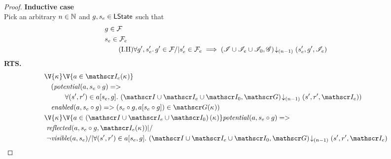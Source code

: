 \begin{lemma}
\begin{proof}
\noindent\textbf{Inductive case }\\
Pick an arbitrary $n \in \mathbb{N}$ and $g, s_e \in \textsf{LState}$ such that
%
\begin{align}
	& g \in  \mathcal{F}_{} \label{LEC:Ass1}\\
	& s_e \in \mathcal{F}_{e} \label{LEC:Ass2}\\
	& \tag{I.H} \forall g', s_e'.\,  g' \in \mathcal{F}_{} /| s'_e \in \mathcal{F}_{e} \implies \left(\mathscr{I} \cup \mathscr{I}_{e} \cup \mathscr{I}_0, \mathscr{G}\right) \!\downarrow_{(n-1)} \left(s_e', g', \mathscr{I}_{e}\right) \label{LEC:IH}
\end{align}
%
\textbf{RTS.}
%
\begin{align}
	& 
	\V{\ca{}}  \V{a\in \lmod_e(\ca{})} \nonumber \\
  &\quad (\m{potential}(a, s_e \composeL g)  => \nonumber\\
  & \quad\qquad\for{(s', r') \in a[s_e, g]} \extendsAMUpto{\lmod \cup \lmod_e \cup \lmod_0, \gmod}{(n-1)}{s'}{r'}{\lmod_e}) \label{LEC:Goal1}\\
%  
  &\quad \m{enabled}(a,s_e \composeL g)
  => (s_e \composeL g, a[s_e \composeL g])\in \gmod(\ca{})) \label{LEC:Goal2}\\
%  
  &\V{\ca{}}\V{a\in \left(\lmod \cup \lmod_e \cup \lmod_0 \right) (\ca{})}
  \m{potential}(a,s_e \composeL g) =>\null \nonumber \\
  &\ \m{reflected}(a, s_e \composeL g,\lmod_e(\ca{})) |/\null \nonumber \\
%  
  &\ \neg\m{visible}(a, s_e) /| \for{(s', r') \in a[s_e, g]} \extendsAMUpto{\lmod \cup \lmod_e \cup \lmod_0, \gmod}{(n-1)}{s'}{r'}{\lmod_e}  \label{LEC:Goal3}
\end{align}
%
%


\end{proof}
\end{lemma}
